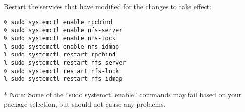 Restart the services that have modified for the changes to take effect:
\begin{verbatim}
% sudo systemctl enable rpcbind
% sudo systemctl enable nfs-server
% sudo systemctl enable nfs-lock
% sudo systemctl enable nfs-idmap
% sudo systemctl restart rpcbind
% sudo systemctl restart nfs-server
% sudo systemctl restart nfs-lock
% sudo systemctl restart nfs-idmap
\end{verbatim}

* Note: Some of the ``sudo systemctl enable'' commands may fail based on your package selection, but should not cause any problems.
\setlength{\parindent}{\savedparindentnfs}%
